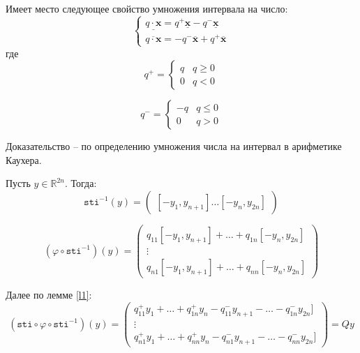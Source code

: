 \begin{lemma} \label{l1} \cite[стр. 583]{shary}
	Имеет место следующее свойство умножения интервала на число:
	\begin{equation}
	\begin{cases}
	\underline{q \cdot \textbf{x}} = q^+\underline{\textbf{x}} - q^-\underline{\textbf{x}} \\
	
	\overline{q \cdot \textbf{x}} = -q^-\overline{\textbf{x}} + q^+\overline{\textbf{x}}
	\end{cases}
	\end{equation}
	где
	\begin{equation}
	q^+ =
	\begin{cases}
	q & q \geq 0 \\
	0 & q < 0
	\end{cases}
	\end{equation}
	
	\begin{equation}
	q^- =
	\begin{cases}
	-q & q \leq 0 \\
	0 & q > 0
	\end{cases}
	\end{equation}
	
	Доказательство -- по определению умножения числа на интервал в арифметике Каухера.
\end{lemma}

Пусть $y \in \mathbb{R}^{2n}$.
Тогда:
\begin{equation}
\mathtt{sti}^{-1}(y)=
\begin{pmatrix}
[-y_1, y_{n + 1}] \dots [-y_n, y_{2n}]
\end{pmatrix}
\end{equation}

\begin{equation}
(\varphi \circ \mathtt{sti}^{-1})(y)=
\begin{pmatrix}
q_{11}[-y_1, y_{n + 1}] + \dots + q_{1n} [-y_n, y_{2n}] \\
\vdots \\
q_{n1}[-y_1, y_{n + 1}] + \dots + q_{nn} [-y_n, y_{2n}]
\end{pmatrix}
\end{equation}

Далее по лемме \ref{l1}:
\begin{equation}
(\mathtt{sti} \circ \varphi \circ \mathtt{sti}^{-1})(y)=
\begin{pmatrix}
q_{11}^+y_1 + \dots + q_{1n}^+ y_n - q_{11}^-y_{n+1} - \dots - q_{1n}^- y_{2n}] \\
\vdots \\
q_{n1}^+y_1 + \dots + q_{nn}^+ y_n - q_{n1}^-y_{n+1} - \dots - q_{nn}^- y_{2n}]
\end{pmatrix}
=
Q\tilde{ }y
\end{equation}

